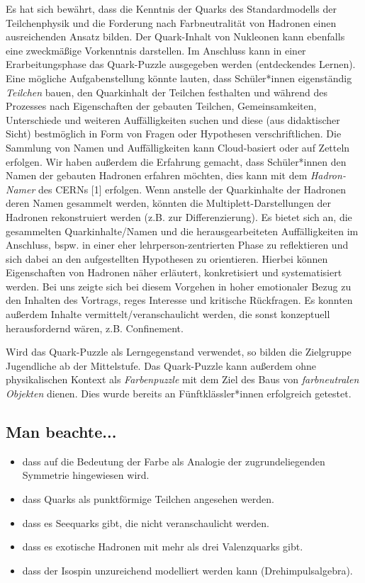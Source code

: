 Es hat sich bewährt, dass die Kenntnis der Quarks des Standardmodells der Teilchenphysik und die Forderung nach Farbneutralität von Hadronen einen ausreichenden Ansatz bilden. Der Quark-Inhalt von Nukleonen kann ebenfalls eine zweckmäßige Vorkenntnis darstellen. Im Anschluss kann in einer Erarbeitungsphase das Quark-Puzzle ausgegeben werden (entdeckendes Lernen). Eine mögliche Aufgabenstellung könnte lauten, dass Schüler*innen eigenständig \emph{Teilchen} bauen, den Quarkinhalt der Teilchen festhalten und während des Prozesses nach Eigenschaften der gebauten Teilchen, Gemeinsamkeiten, Unterschiede und weiteren Auffälligkeiten suchen und diese (aus didaktischer Sicht) bestmöglich in Form von Fragen oder Hypothesen verschriftlichen. Die Sammlung von Namen und Auffälligkeiten kann Cloud-basiert oder auf Zetteln erfolgen.  Wir haben außerdem die Erfahrung gemacht, dass Schüler*innen den Namen der gebauten Hadronen erfahren möchten, dies kann mit dem \emph{Hadron-Namer} des CERNs [1] erfolgen. Wenn anstelle der Quarkinhalte der Hadronen deren Namen gesammelt werden, könnten die Multiplett-Darstellungen der Hadronen rekonstruiert werden (z.B. zur Differenzierung). Es bietet sich an, die gesammelten Quarkinhalte/Namen und die herausgearbeiteten Auffälligkeiten im Anschluss, bspw. in einer eher lehrperson-zentrierten Phase zu reflektieren und sich dabei an den aufgestellten Hypothesen zu orientieren. Hierbei können Eigenschaften von Hadronen näher erläutert, konkretisiert und systematisiert werden. Bei uns zeigte sich bei diesem Vorgehen in hoher emotionaler Bezug zu den Inhalten des Vortrags, reges Interesse und kritische Rückfragen. Es konnten außerdem Inhalte vermittelt/veranschaulicht werden, die sonst konzeptuell herausfordernd wären, z.B. Confinement. 

Wird das Quark-Puzzle als Lerngegenstand verwendet, so bilden die Zielgruppe Jugendliche ab der Mittelstufe. Das Quark-Puzzle kann außerdem ohne physikalischen Kontext als \emph{Farbenpuzzle} mit dem Ziel des Baus von \emph{farbneutralen Objekten} dienen. Dies wurde bereits an Fünftklässler*innen erfolgreich getestet. 

\subsection*{Man beachte...}
\begin{itemize}[label=...]
    \item dass auf die Bedeutung der Farbe als Analogie der zugrundeliegenden Symmetrie hingewiesen wird.
    \item dass Quarks als punktförmige Teilchen angesehen werden.
    \item dass es Seequarks gibt, die nicht veranschaulicht werden.
    \item dass es exotische Hadronen mit mehr als drei Valenzquarks gibt.
    \item dass der Isospin unzureichend modelliert werden kann (Drehimpulsalgebra).
\end{itemize}
